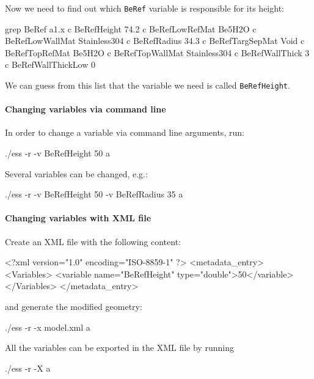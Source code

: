 Now we need to find out which {\tt BeRef} variable is responsible for its height:
\begin{bash}
grep BeRef a1.x 
c BeRefHeight 74.2
c BeRefLowRefMat Be5H2O
c BeRefLowWallMat Stainless304
c BeRefRadius 34.3
c BeRefTargSepMat Void
c BeRefTopRefMat Be5H2O
c BeRefTopWallMat Stainless304
c BeRefWallThick 3
c BeRefWallThickLow 0
\end{bash}

We can guess from this list that the variable we need is called {\tt BeRefHeight}.

\paragraph[Command line]{Changing variables via command line}
In order to change a variable via command line arguments, run:
\begin{bash}
  ./ess -r -v BeRefHeight 50 a
\end{bash}
Several variables can be changed, e.g.:
\begin{bash}
  ./ess -r -v BeRefHeight 50 -v BeRefRadius 35 a
\end{bash}

\paragraph[XML file]{Changing variables with XML file}
Create an XML file with the following content:

\begin{xml}
<?xml version="1.0" encoding="ISO-8859-1" ?>
<metadata_entry>
  <Variables>
    <variable name="BeRefHeight" type="double">50</variable>
  </Variables>
</metadata_entry>
\end{xml}

and generate the modified geometry:
\begin{bash}
  ./ess -r -x model.xml a
\end{bash}

All the variables can be exported in the XML file by running
\begin{bash}
  ./ess -r -X a
\end{bash}
